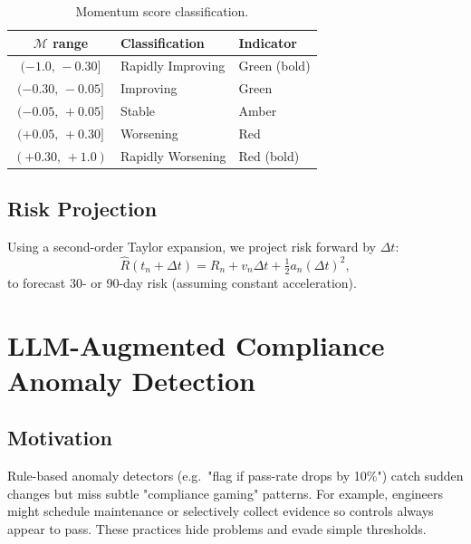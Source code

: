 \documentclass[conference]{IEEEtran}
\begin{document}
\begin{table}[h]
  \centering
  \caption{Momentum score classification.}
  \label{tab:momentum}
  \begin{tabular}{cll}
    \toprule
    $\mathcal{M}$ range & Classification & Indicator \\
    \midrule
    $(-1.0,\,-0.30]$ & Rapidly Improving & Green (bold) \\
    $(-0.30,\,-0.05]$ & Improving          & Green \\
    $(-0.05,\,+0.05]$ & Stable             & Amber \\
    $(+0.05,\,+0.30]$ & Worsening          & Red \\
    $(+0.30,\,+1.0)$  & Rapidly Worsening  & Red (bold) \\
    \bottomrule
  \end{tabular}
\end{table}

\subsection{Risk Projection}
Using a second-order Taylor expansion, we project risk forward by $\Delta t$:
\[
  \hat{R}(t_n+\Delta t) = R_n + v_n \Delta t + \tfrac{1}{2} a_n (\Delta t)^2,
  \label{eq:projection}
\]
to forecast 30- or 90-day risk (assuming constant acceleration).

\section{LLM-Augmented Compliance Anomaly Detection}
\label{sec:llmcad}

\subsection{Motivation}
Rule-based anomaly detectors (e.g.\ "flag if pass-rate drops by 10\%") catch sudden changes but miss subtle "compliance gaming" patterns. For example, engineers might schedule maintenance or selectively collect evidence so controls always appear to pass. These practices hide problems and evade simple thresholds.
\end{document}
